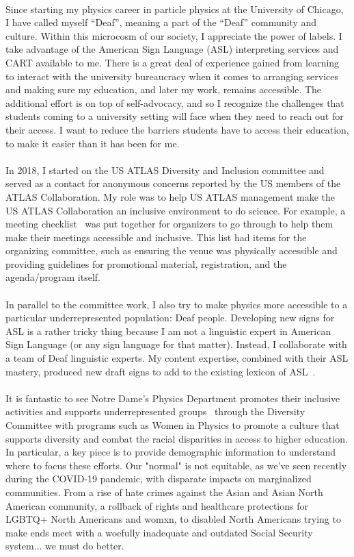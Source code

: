 \documentclass[10pt,a4paper,sans]{moderncv} %
\begin{document}
\\
Since starting my physics career in particle physics at the University of Chicago, I have called myself ``Deaf'', meaning a part of the ``Deaf'' community and culture. Within this microcosm of our society, I appreciate the power of labels. I take advantage of the American Sign Language (ASL) interpreting services and CART available to me. There is a great deal of experience gained from learning to interact with the university bureaucracy when it comes to arranging services and making sure my education, and later my work, remains accessible. The additional effort is on top of self-advocacy, and so I recognize the challenges that students coming to a university setting will face when they need to reach out for their access. I want to reduce the barriers students have to access their education, to make it easier than it has been for me.
\\
\\
In 2018, I started on the US ATLAS Diversity and Inclusion committee and served as a contact for anonymous concerns reported by the US members of the ATLAS Collaboration. My role was to help US ATLAS management make the US ATLAS Collaboration an inclusive environment to do science. For example, a meeting checklist~\cite{Assamagan:2022oka} was put together for organizers to go through to help them make their meetings accessible and inclusive. This list had items for the organizing committee, such as ensuring the venue was physically accessible and providing guidelines for promotional material, registration, and the agenda/program itself.
\\
\\
In parallel to the committee work, I also try to make physics more accessible to a particular underrepresented population: Deaf people. Developing new signs for ASL is a rather tricky thing because I am not a linguistic expert in American Sign Language (or any sign language for that matter). Instead, I collaborate with a team of Deaf linguistic experts. My content expertise, combined with their ASL mastery, produced new draft signs to add to the existing lexicon of ASL~\cite{ICPS2021, MatterInterpretation}.
\\
\\
It is fantastic to see Notre Dame's Physics Department promotes their inclusive activities and supports underrepresented groups~\cite{diversitypage} through the Diversity Committee with programs such as Women in Physics to promote a culture that supports diversity and combat the racial disparities in access to higher education. In particular, a key piece is to provide demographic information to understand where to focus these efforts. Our "normal" is not equitable, as we've seen recently during the COVID-19 pandemic, with disparate impacts on marginalized communities. From a rise of hate crimes against the Asian and Asian North American community, a rollback of rights and healthcare protections for LGBTQ+ North Americans and womxn, to disabled North Americans trying to make ends meet with a woefully inadequate and outdated Social Security system... we must do better.
\end{document}
